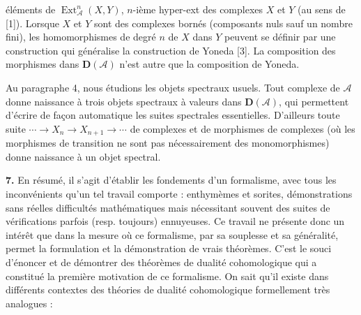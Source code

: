 %
éléments de $\operatorname{Ext}_{\mathcal A}^{n}(X,Y)$, $n$-ième hyper-ext
des complexes $X$ et $Y$ (au sens de [1]). Lorsque $X$ et $Y$ sont des
complexes bornés (composants nuls sauf un nombre fini), les homomorphismes de
degré $n$ de $X$ dans $Y$ peuvent se définir par une construction qui
généralise la construction de Yoneda [3]. La composition des morphismes dans
$\mathbf D(\mathcal A)$ n'est autre que la composition de Yoneda.

Au paragraphe 4, nous étudions les objets spectraux usuels. Tout complexe de
$\mathcal A$ donne naissance à trois objets spectraux à valeurs dans
$\mathbf D(\mathcal A)$, qui permettent d'écrire de façon automatique les
suites spectrales essentielles. D'ailleurs toute suite
$\cdots\to X_n\to X_{n+1}\to\cdots$ de complexes et de morphismes de
complexes (où les morphismes de transition ne sont pas nécessairement des
monomorphismes) donne naissance à un objet spectral.

\noindent\textbf{7.}\quad
En résumé, il s'agit d'établir les fondements d'un formalisme, avec tous les
inconvénients qu'un tel travail comporte : enthymèmes et sorites,
démonstrations sans réelles difficultés mathématiques mais nécessitant
souvent des suites de vérifications parfois (resp. toujours) ennuyeuses. Ce
travail ne présente donc un intérêt que dans la mesure où ce formalisme, par
sa souplesse et sa généralité, permet la formulation et la démonstration de
\og vrais\fg{} théorèmes. C'est le souci d'énoncer et de démontrer des
théorèmes de dualité cohomologique qui a constitué la première motivation de
ce formalisme. On sait qu'il existe dans différents contextes des théories de
dualité cohomologique formellement très analogues :

